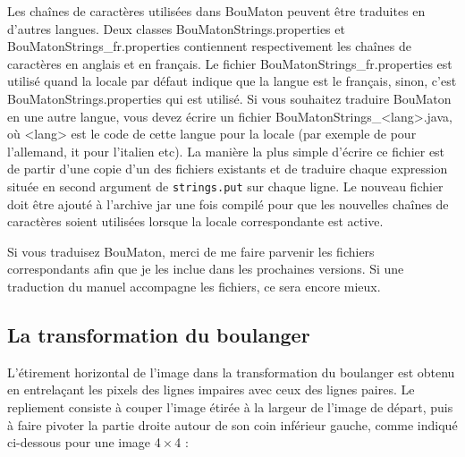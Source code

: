 \documentclass[a4paper]{article}
\newcommand{\BouMaton}{\textsf{BouMaton}\xspace}
\newcommand{\filename}[1]{\textsf{#1}}
\newcommand{\picdim}[2]{#1\,\(\times\)\,#2}
\begin{document}
  Les chaînes de caractères utilisées dans \BouMaton peuvent être 
  traduites en d'autres langues. Deux classes 
  \filename{BouMatonStrings.properties} et \filename{BouMatonStrings\_fr.properties} 
  contiennent respectivement les chaînes de caractères en anglais et en français. 
	Le fichier \filename{BouMatonStrings\_fr.properties} est utilisé quand la 
  locale par défaut indique que la langue est le français, sinon, c'est 
  \filename{BouMatonStrings.properties} qui est utilisé. Si vous 
  souhaitez traduire \BouMaton en une autre langue, vous devez écrire 
  un fichier \filename{BouMatonStrings\_<lang>.java}, où 
  \filename{<lang>} est le code de cette langue pour la locale (par 
  exemple \filename{de} pour l'allemand, \filename{it} pour l'italien 
  etc). La manière la plus simple d'écrire ce fichier est de partir 
  d'une copie d'un des fichiers existants et de traduire chaque 
  expression située en second argument de \texttt{strings.put} sur chaque ligne.
  Le nouveau fichier doit être ajouté à l'archive jar une fois compilé pour que les 
  nouvelles chaînes de caractères soient utilisées lorsque la locale 
  correspondante est active.

  Si vous traduisez \BouMaton, merci de me faire parvenir les fichiers 
  correspondants afin que je les inclue dans les prochaines versions. 
  Si une traduction du manuel accompagne les fichiers, ce sera encore mieux.
  
  \subsection{La transformation du boulanger}
  L'étirement horizontal de l'image dans la transformation du boulanger 
  est obtenu en entrelaçant les pixels des lignes impaires avec ceux 
  des lignes paires. Le repliement consiste à couper l'image étirée à 
  la largeur de l'image de départ, puis à faire pivoter la partie 
  droite autour de son coin inférieur gauche, comme indiqué ci-dessous 
  pour une image \picdim{4}{4} :
  
\end{document}
